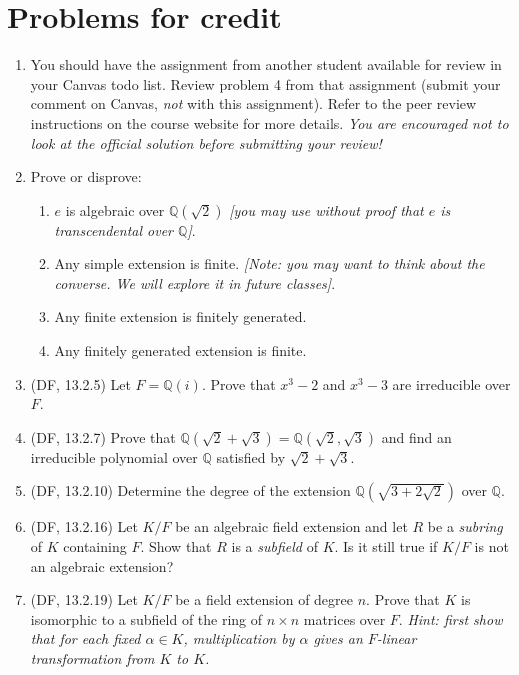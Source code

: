 \documentclass{amsart}
\theoremstyle{definition}
\newcommand{\Qq}{\mathbb{Q}}
\begin{document}
\section*{Problems for credit}
\begin{enumerate}
\item You should have the assignment from another student available for review in your Canvas todo list. Review problem 4 from that assignment (submit your comment on Canvas, \emph{not} with this assignment). Refer to the peer review instructions on the course website for more details. \emph{You are encouraged not to look at the official solution before submitting your review!}
\item Prove or disprove:
  \begin{enumerate}
  \item $e$ is algebraic over $\Qq (\sqrt{2})$ \emph{[you may use without proof that $e$ is transcendental over $\Qq$]}.
  \item Any simple extension is finite. \emph{[Note: you may want to think about the converse. We will explore it in future classes]}.
  \item Any finite extension is finitely generated.
  \item Any finitely generated extension is finite.
  \end{enumerate}
\item (DF, 13.2.5) Let $F = \Qq (i)$. Prove that $x^3 - 2$ and $x^3 - 3$ are irreducible over $F$.
\item (DF, 13.2.7) Prove that $\Qq (\sqrt{2} + \sqrt{3}) = \Qq (\sqrt{2}, \sqrt{3})$ and find an irreducible polynomial over $\Qq$ satisfied by $\sqrt{2} + \sqrt{3}$.
\item (DF, 13.2.10) Determine the degree of the extension $\Qq (\sqrt{3 + 2 \sqrt{2}})$ over $\Qq$.

\item (DF, 13.2.16) Let $K / F$ be an algebraic field extension and let $R$ be a \emph{subring} of $K$ containing $F$. Show that $R$ is a \emph{subfield} of $K$. Is it still true if $K / F$ is not an algebraic extension?
\item (DF, 13.2.19) Let $K / F$ be a field extension of degree $n$. Prove that $K$ is isomorphic to a subfield of the ring of $n \times n$ matrices over $F$. \emph{Hint: first show that for each fixed $\alpha \in K$, multiplication by $\alpha$ gives an $F$-linear transformation from $K$ to $K$.}
\end{enumerate}
\end{document}
